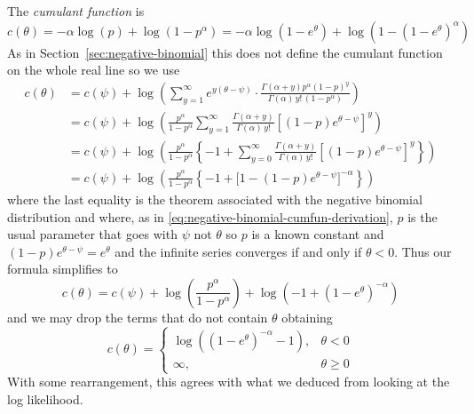 The \emph{cumulant function} is
$$
   c(\theta)
   =
   - \alpha \log(p) + \log(1 - p^\alpha)
   =
   - \alpha \log(1 - e^\theta) + \log(1 - (1 - e^\theta)^\alpha)
$$
As in Section~\ref{sec:negative-binomial} this does not define the
cumulant function on the whole real line so we use
\begin{align*}
   c(\theta)
   & =
   c(\psi) +
   \log \left( \sum_{y = 1}^\infty
   e^{y (\theta - \psi)} \cdot
   \frac{\Gamma(\alpha + y) p^\alpha (1-p)^y}
   {\Gamma(\alpha) \, y! \, (1 - p^\alpha)}
   \right)
   \\
   & =
   c(\psi) +
   \log \left(
   \frac{p^\alpha}{1 - p^\alpha}
   \sum_{y = 1}^\infty
   \frac{\Gamma(\alpha + y)}{\Gamma(\alpha) \, y!}
   \left[ (1-p) e^{\theta - \psi} \right]^y
   \right)
   \\
   & =
   c(\psi) +
   \log \left(
   \frac{p^\alpha}{1 - p^\alpha}
   \left\{
   - 1 +
   \sum_{y = 0}^\infty
   \frac{\Gamma(\alpha + y)}{\Gamma(\alpha) \, y!}
   \left[ (1-p) e^{\theta - \psi} \right]^y
   \right\}
   \right)
   \\
   & =
   c(\psi) +
   \log \left(
   \frac{p^\alpha}{1 - p^\alpha}
   \left\{
   - 1 +
   \bigl[ 1 - (1-p) e^{\theta - \psi} \bigr]^{- \alpha}
   \right\}
   \right)
\end{align*}
where the last equality is the theorem associated with the negative
binomial distribution \citep{brand-name-distributions}
and where, as in \eqref{eq:negative-binomial-cumfun-derivation}, $p$ is
the usual parameter that goes with $\psi$ not $\theta$ so $p$ is a known
constant and $(1-p) e^{\theta - \psi} = e^\theta$ and the infinite series
converges if and only if $\theta < 0$.
Thus our formula simplifies to
$$
   c(\theta) = c(\psi) + \log\left( \frac{p^\alpha}{1 - p^\alpha} \right)
   +
   \log\left(- 1 + (1 - e^\theta)^{- \alpha} \right)
$$
and we may drop the terms that do not contain $\theta$ obtaining
$$
   c(\theta)
   =
   \begin{cases}
   \log\left((1 - e^\theta)^{- \alpha} - 1\right), & \theta < 0 \\
   \infty, & \theta \ge 0
   \end{cases}
$$
With some rearrangement, this agrees with what we deduced from looking
at the log likelihood.
%
%
%

